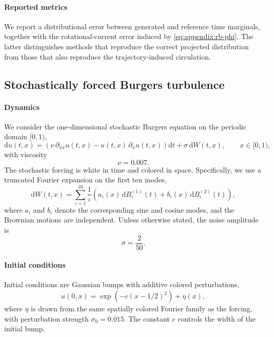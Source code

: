 \documentclass[oneside,11pt]{article}
\theoremstyle{remark}
\begin{document}
\paragraph{Reported metrics}
We report a distributional error between generated and reference time
marginals, together with the rotational-current error induced by
\eqref{eq:appendix:rb-phi}.  The latter distinguishes methods that reproduce
the correct projected distribution from those that also reproduce the
trajectory-induced circulation.

\subsection{Stochastically forced Burgers turbulence}
\label{appendix:BurgersExample}
\paragraph{Dynamics}
We consider the one-dimensional stochastic Burgers equation on the periodic
domain $[0,1)$,
\begin{equation}
    \mathrm d u(t,x)
    =
    \left(
        \nu\,\partial_{xx}u(t,x)
        -
        u(t,x)\,\partial_x u(t,x)
    \right)\mathrm dt
    +
    \sigma\,\mathrm dW(t,x),
    \qquad x\in[0,1),
    \label{eq:appendix:burgers}
\end{equation}
with viscosity
\[
    \nu = 0.007.
\]
The stochastic forcing is white in time and colored in space.  Specifically,
we use a truncated Fourier expansion on the first ten modes,
\[
    \mathrm dW(t,x)
    =
    \sum_{\iota=1}^{10}
    \frac{1}{\iota}
    \left(
        a_\iota(x)\,\mathrm dB_{\iota}^{(1)}(t)
        +
        b_\iota(x)\,\mathrm dB_{\iota}^{(2)}(t)
    \right),
\]
where $a_\iota$ and $b_\iota$ denote the corresponding sine and cosine modes,
and the Brownian motions are independent.  Unless otherwise stated, the noise
amplitude is
\[
    \sigma = \frac{2}{50}.
\]

\paragraph{Initial conditions}
Initial conditions are Gaussian bumps with additive colored perturbations,
\begin{equation}
    u(0,x)
    =
    \exp\!\left(-c(x-1/2)^2\right)
    +
    \eta(x),
    \label{eq:appendix:burgers-ic}
\end{equation}
where $\eta$ is drawn from the same spatially colored Fourier family as the
forcing, with perturbation strength $\sigma_0=0.015$.  The constant $c$
controls the width of the initial bump.
\end{document}
